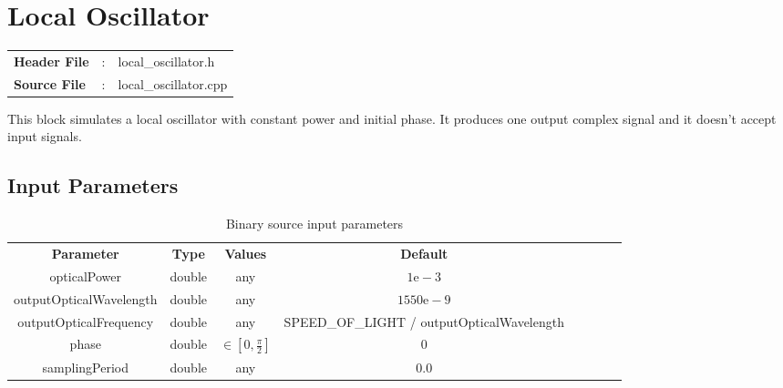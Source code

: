 \clearpage

\section{Local Oscillator}

\begin{tcolorbox}	
	\begin{tabular}{p{2.75cm} p{0.2cm} p{10.5cm}} 	
		\textbf{Header File}   &:& local\_oscillator.h \\
		\textbf{Source File}   &:& local\_oscillator.cpp \\
	\end{tabular}
\end{tcolorbox}

This block simulates a local oscillator with constant power and initial phase. It produces one output complex signal and it doesn't accept input signals.

\subsection*{Input Parameters}

\begin{table}[h]
	\centering
	\begin{tabular}{|c|c|c|c|cccc}
		\cline{1-4}
		\textbf{Parameter} & \textbf{Type} & \textbf{Values} &   \textbf{Default}& \\ \cline{1-4}
		opticalPower & double & any & $1\text{e}-3$ \\ \cline{1-4}
		outputOpticalWavelength & double & any & $1550\text{e}-9$ \\ \cline{1-4}
		outputOpticalFrequency & double & any &  SPEED\_OF\_LIGHT / outputOpticalWavelength \\ \cline{1-4}
		phase & double & $\in \left[0,\frac{\pi}{2}\right]$ & $0$ \\ \cline{1-4}
		samplingPeriod & double & any & $0.0$ \\ \cline{1-4}
	\end{tabular}
	\caption{Binary source input parameters}
	\label{table:LO_in_par}
\end{table}

%

